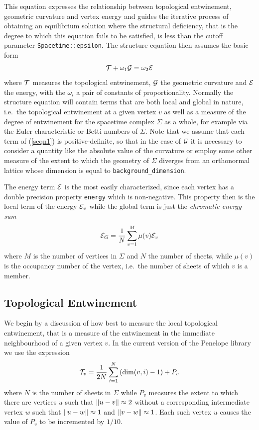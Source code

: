 \documentclass[12pt,letterpaper]{report}
\begin{document}
This equation expresses the relationship between topological entwinement, geometric 
curvature and vertex energy and guides the iterative process of obtaining an equilibrium 
solution where the structural deficiency, that is the degree to which this equation fails 
to be satisfied, is less than the cutoff parameter \texttt{Spacetime::epsilon}. The structure 
equation then assumes the basic form 
\begin{equation}
{\cal T} + \omega_1 {\cal G} = \omega_2 {\cal E}\label{seqn1}
\end{equation}
where $\cal{T}$ measures the topological entwinement, $\cal{G}$ the geometric curvature 
and $\cal{E}$ the energy, with the $\omega_i$ a pair of constants of proportionality. Normally 
the structure equation will contain terms that are both 
local and global in nature, i.e.\ the topological entwinement at a given vertex $v$ as 
well as a measure of the degree of entwinement for the spacetime complex $\Sigma$ as a 
whole, for example via the Euler characteristic or Betti numbers of $\Sigma$. Note that 
we assume that each term of (\ref{seqn1}) is positive-definite, so that in the case of 
$\cal{G}$ it is necessary to consider a quantity like the absolute value of the curvature 
or employ some other measure of the extent to which the geometry of $\Sigma$ diverges from 
an orthonormal lattice whose dimension is equal to \texttt{background\_dimension}.

The energy term ${\cal E}$ is the most easily characterized, since each vertex has a 
double precision property \texttt{energy} which is non-negative. This property then is the 
local term of the energy ${\cal E}_v$ while the global term is just the \emph{chromatic energy 
sum} 
\begin{equation*}
{\cal E}_G = \frac {1}{N}\sum_{v=1}^M \mu(v) {\cal E}_v
\end{equation*}  
where $M$ is the number of vertices in $\Sigma$ and $N$ the number of sheets, while $\mu(v)$ is 
the occupancy number of the vertex, i.e.\ the number of sheets of which $v$ is a member. 

\subsection{Topological Entwinement}

We begin by a discussion of how best to measure the local topological entwinement, that is a 
measure of the entwinement in the immediate neighbourhood of a given vertex $v$. In the current 
version of the Penelope library we use the expression 
\begin{equation}
{\cal T}_v = \frac {1}{2N} \sum_{i=1}^N\left(\dim(v,i) - 1\right) + P_v \label{tterm_local}
\end{equation}
where $N$ is the number of sheets in $\Sigma$ while $P_v$ measures the extent to which there are 
vertices $u$ such that $\left\lVert u - v\right\rVert \approx 2$ without a corresponding intermediate vertex $w$ 
such that $\left\lVert u - w\right\rVert\approx 1$ and $\left\lVert v - w\right\rVert \approx 1$. Each such vertex $u$ causes the 
value of $P_v$ to be incremented by $1/10$. 
\end{document}
